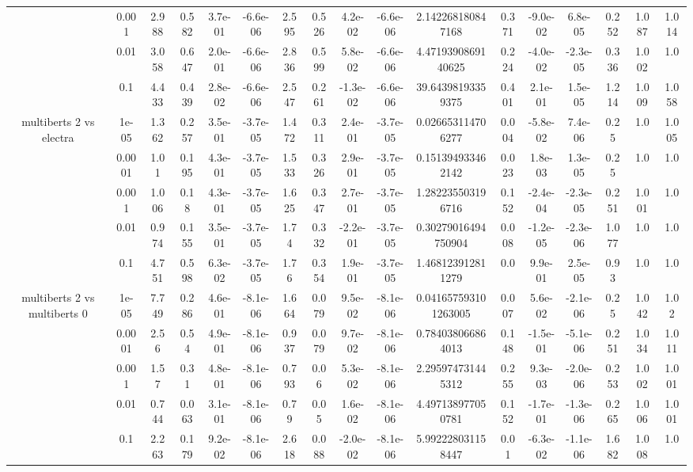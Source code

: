 \begin{tabular}{|c|c|c|c|c|c|c|c|c|c|c|c|c|c|c|c|c|}
 & 0.001 & 2.988 & 0.582 & 3.7e-01 & -6.6e-06 & 2.595 & 0.526 & 4.2e-02 & -6.6e-06 & 2.142268180847168 & 0.371 & -9.0e-02 & 6.8e-05 & 0.252 & 1.087 & 1.014 \\
 & 0.01 & 3.058 & 0.647 & 2.0e-01 & -6.6e-06 & 2.836 & 0.599 & 5.8e-02 & -6.6e-06 & 4.4719390869140625 & 0.224 & -4.0e-02 & -2.3e-05 & 0.336 & 1.002 & 1.0 \\
 & 0.1 & 4.433 & 0.439 & 2.8e-02 & -6.6e-06 & 2.547 & 0.261 & -1.3e-02 & -6.6e-06 & 39.64398193359375 & 0.401 & 2.1e-01 & 1.5e-05 & 1.214 & 1.009 & 1.058 \\
\hline
\multirow{5}{*}{multiberts 2 vs electra } & 1e-05 & 1.362 & 0.257 & 3.5e-01 & -3.7e-05 & 1.472 & 0.311 & 2.4e-01 & -3.7e-05 & 0.026653114706277 & 0.004 & -5.8e-02 & 7.4e-06 & 0.25 & 1.0 & 1.005 \\
 & 0.0001 & 1.01 & 0.195 & 4.3e-01 & -3.7e-05 & 1.533 & 0.326 & 2.9e-01 & -3.7e-05 & 0.151394933462142 & 0.023 & 1.8e-03 & 1.3e-05 & 0.25 & 1.0 & 1.0 \\
 & 0.001 & 1.006 & 0.18 & 4.3e-01 & -3.7e-05 & 1.625 & 0.347 & 2.7e-01 & -3.7e-05 & 1.282235503196716 & 0.152 & -2.4e-04 & -2.3e-05 & 0.251 & 1.001 & 1.0 \\
 & 0.01 & 0.974 & 0.155 & 3.5e-01 & -3.7e-05 & 1.74 & 0.332 & -2.2e-01 & -3.7e-05 & 0.30279016494750904 & 0.008 & -1.2e-05 & -2.3e-06 & 1.077 & 1.0 & 1.0 \\
 & 0.1 & 4.751 & 0.598 & 6.3e-02 & -3.7e-05 & 1.76 & 0.354 & 1.9e-01 & -3.7e-05 & 1.468123912811279 & 0.0 & 9.9e-01 & 2.5e-05 & 0.93 & 1.0 & 1.0 \\
\hline
\multirow{5}{*}{multiberts 2 vs multiberts 0} & 1e-05 & 7.749 & 0.286 & 4.6e-01 & -8.1e-06 & 1.664 & 0.079 & 9.5e-02 & -8.1e-06 & 0.041657593101263005 & 0.007 & 5.6e-02 & -2.1e-06 & 0.25 & 1.042 & 1.02 \\
 & 0.0001 & 2.56 & 0.54 & 4.9e-01 & -8.1e-06 & 0.937 & 0.079 & 9.7e-02 & -8.1e-06 & 0.784038066864013 & 0.148 & -1.5e-01 & -5.1e-06 & 0.251 & 1.034 & 1.011 \\
 & 0.001 & 1.57 & 0.31 & 4.8e-01 & -8.1e-06 & 0.793 & 0.06 & 5.3e-02 & -8.1e-06 & 2.295974731445312 & 0.255 & 9.3e-03 & -2.0e-06 & 0.253 & 1.002 & 1.001 \\
 & 0.01 & 0.744 & 0.063 & 3.1e-01 & -8.1e-06 & 0.79 & 0.05 & 1.6e-02 & -8.1e-06 & 4.497138977050781 & 0.152 & -1.7e-01 & -1.3e-06 & 0.265 & 1.006 & 1.001 \\
 & 0.1 & 2.263 & 0.179 & 9.2e-02 & -8.1e-06 & 2.618 & 0.088 & -2.0e-02 & -8.1e-06 & 5.992228031158447 & 0.01 & -6.3e-02 & -1.1e-06 & 1.682 & 1.008 & 1.0 \\

\end{tabular}
